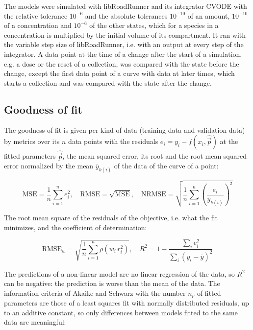 \documentclass{article}
\begin{document}
The models were simulated with libRoadRunner \cite{Welsh2023} and its integrator CVODE \cite{Hindmarsh2005} with the relative tolerance $10^{-6}$ and the absolute tolerances $10^{-10}$ of an amount, $10^{-10}$ of a concentration and $10^{-6}$ of the other states, which for a species in a concentration is multiplied by the initial volume of its compartment. It ran with the variable step size of libRoadRunner, i.e. with an output at every step of the integrator. A data point at the time of a change after the start of a simulation, e.g. a dose or the reset of a collection, was compared with the state before the change, except the first data point of a curve with data at later times, which starts a collection and was compared with the state after the change.

\subsection{Goodness of fit}

The goodness of fit is given per kind of data (training data and validation data) by metrics over its $n$ data points with the residuals $e_i = y_i - f(x_i, \hat{\vec{p}})$ at the fitted parameters $\hat{\vec{p}}$, the mean squared error, its root and the root mean squared error normalized by the mean $\overline{y}_{k(i)}$ of the data of the curve of a point:

\begin{equation}
\mathrm{MSE} = \frac{1}{n} \sum_{i=1}^{n} e_i^2, \quad \mathrm{RMSE} = \sqrt{\mathrm{MSE}}, \quad \mathrm{NRMSE} = \sqrt{\frac{1}{n} \sum_{i=1}^{n} \left(\frac{e_i}{\overline{y}_{k(i)}}\right)^2}
\end{equation}

The root mean square of the residuals of the objective, i.e. what the fit minimizes, and the coefficient of determination:

\begin{equation}
\mathrm{RMSE}_w = \sqrt{\frac{1}{n} \sum_{i=1}^{n} \rho\left(w_i\, r_i^2\right)}, \quad R^2 = 1 - \frac{\sum_{i} e_i^2}{\sum_{i} \left(y_i - \overline{y}\right)^2}
\end{equation}

The predictions of a non-linear model are no linear regression of the data, so $R^2$ can be negative: the prediction is worse than the mean of the data. The information criteria of Akaike \cite{Akaike1974} and Schwarz \cite{Schwarz1978} with the number $n_p$ of fitted parameters are those of a least squares fit with normally distributed residuals, up to an additive constant, so only differences between models fitted to the same data are meaningful:
\end{document}
